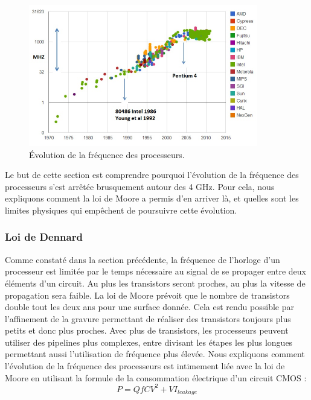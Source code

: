 \begin{figure}
    \center
    \includegraphics[width=10cm]{images/cpu_frequency.jpg}
    \caption{\label{pic_cpu_frequency} Évolution de la fréquence des processeurs\protect\footnotemark.}
\end{figure}

Le but de cette section est comprendre pourquoi l'évolution de la fréquence des processeurs s'est arrêtée brusquement autour des 4 GHz. Pour cela, nous expliquons comment la loi de Moore a permis d'en arriver là, et quelles sont les limites physiques qui empêchent de poursuivre cette évolution.

\subsubsection{Loi de Dennard}
Comme constaté dans la section précédente, la fréquence de l'horloge d'un processeur est limitée par le temps nécessaire au signal de se propager entre deux éléments d'un circuit. Au plus les transistors seront proches, au plus la vitesse de propagation sera faible. La loi de Moore prévoit que le nombre de transistors double tout les deux ans pour une surface donnée. Cela est rendu possible par l'affinement de la gravure permettant de réaliser des transistors toujours plus petits et donc plus proches. Avec plus de transistors, les processeurs peuvent utiliser des pipelines plus complexes, entre divisant les étapes les plus longues permettant aussi l'utilisation de fréquence plus élevée. Nous expliquons comment l'évolution de la fréquence des processeurs est intimement liée avec la loi de Moore en utilisant la formule de la consommation électrique d'un circuit CMOS \cite{martin2014post}:
\begin{equation}
P = QfCV^{2} +  VI_{leakage}
\label{eq:power}
\end{equation}

